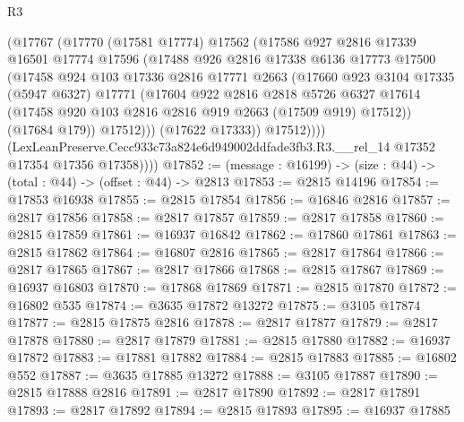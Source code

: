 \begin{lexlean}{R3}
\begin{coremodule}
                (@17767
                  (@17770
                    (@17581 @17774)
                    @17562
                    (@17586
                      @927
                      @2816
                      @17339
                      @16501
                      @17774
                      @17596
                      (@17488
                        @926
                        @2816
                        @17338
                        @6136
                        @17773
                        @17500
                        (@17458
                          @924
                          @103
                          @17336
                          @2816
                          @17771
                          @2663
                          (@17660
                            @923
                            @3104
                            @17335
                            (@5947 @6327)
                            @17771
                            (@17604
                              @922
                              @2816
                              @2818
                              @5726
                              @6327
                              @17614
                              (@17458 @920 @103 @2816 @2816 @919 @2663 (@17509 @919) @17512))
                            (@17684 @179))
                          @17512)))
                    (@17622 @17333))
                  @17512))))
          (LexLeanPreserve.Cecc933c73a824e6d949002ddfade3fb3.R3.__rel_14
            @17352
            @17354
            @17356
            @17358))))
@17852 := (message : @16199) -> (size : @44) -> (total : @44) -> (offset : @44) -> @2813
@17853 := @2815 @14196
@17854 := @17853 @16938
@17855 := @2815 @17854
@17856 := @16846 @2816
@17857 := @2817 @17856
@17858 := @2817 @17857
@17859 := @2817 @17858
@17860 := @2815 @17859
@17861 := @16937 @16842
@17862 := @17860 @17861
@17863 := @2815 @17862
@17864 := @16807 @2816
@17865 := @2817 @17864
@17866 := @2817 @17865
@17867 := @2817 @17866
@17868 := @2815 @17867
@17869 := @16937 @16803
@17870 := @17868 @17869
@17871 := @2815 @17870
@17872 := @16802 @535
@17874 := @3635 @17872 @13272
@17875 := @3105 @17874
@17877 := @2815 @17875 @2816
@17878 := @2817 @17877
@17879 := @2817 @17878
@17880 := @2817 @17879
@17881 := @2815 @17880
@17882 := @16937 @17872
@17883 := @17881 @17882
@17884 := @2815 @17883
@17885 := @16802 @552
@17887 := @3635 @17885 @13272
@17888 := @3105 @17887
@17890 := @2815 @17888 @2816
@17891 := @2817 @17890
@17892 := @2817 @17891
@17893 := @2817 @17892
@17894 := @2815 @17893
@17895 := @16937 @17885

\end{coremodule}
\end{lexlean}
